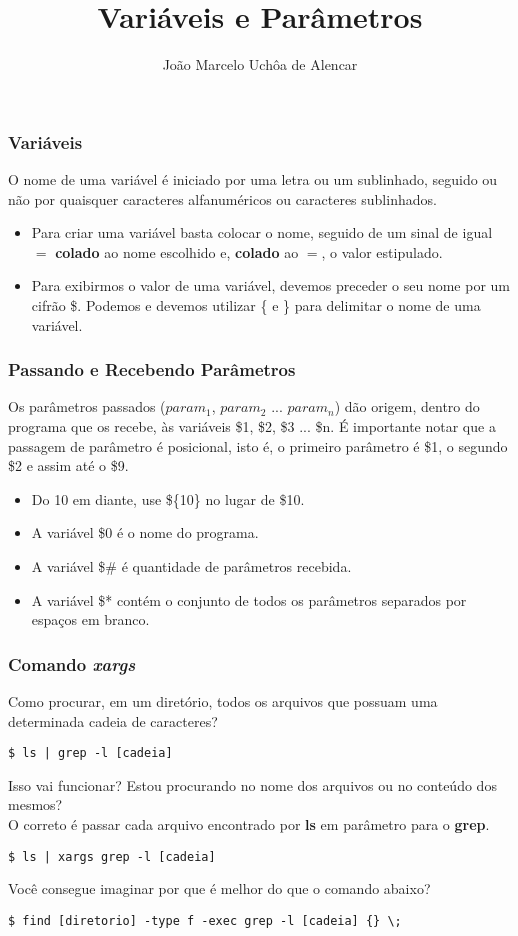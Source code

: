\documentclass{beamer}
\title{Variáveis e Parâmetros}
\author[João Marcelo Uchôa de Alencar]{João Marcelo Uchôa de Alencar}
\institute{Universidade Federal do Ceará - Quixadá}
\begin{document}
   \begin{frame}
      \titlepage
   \end{frame}

   \begin{frame}
      \frametitle{Variáveis}
      O nome de uma variável é iniciado por uma letra ou um sublinhado, seguido ou não por quaisquer caracteres alfanuméricos ou caracteres sublinhados.
      \begin{itemize}
         \item Para criar uma variável basta colocar o nome, seguido de um sinal de igual $=$ \textbf{colado} ao nome escolhido e, \textbf{colado} ao $=$, o valor estipulado.
	      \item Para exibirmos o valor de uma variável, devemos preceder o seu nome por um cifrão \$. Podemos e devemos utilizar \{ e \} para delimitar o nome de uma variável.
      \end{itemize}
   \end{frame}

   \begin{frame}
      \frametitle{Passando e Recebendo Parâmetros}
      Os parâmetros passados ($param_ {1}$, $param_ {2}$ ... $param_ {n}$) dão origem, dentro do programa que os recebe, às variáveis \$1, \$2, \$3 ... \$n. É importante notar que a passagem de parâmetro é posicional, isto é, o primeiro parâmetro é \$1, o segundo \$2 e assim até o \$9.
      \begin{itemize}
         \item Do 10 em diante, use \$\{10\} no lugar de \$10.
	      \item A variável \$0 é o nome do programa.
	      \item A variável \$\# é quantidade de parâmetros recebida.
	      \item A variável \$* contém o conjunto de todos os parâmetros separados por espaços em branco.
      \end{itemize}
   \end{frame}

\begin{frame}[fragile]
   \frametitle{Comando \textit{xargs}}
   Como procurar, em um diretório, todos os arquivos que possuam uma determinada cadeia de caracteres? 
   \begin{verbatim}	
$ ls | grep -l [cadeia] 
   \end{verbatim}
   Isso vai funcionar? Estou procurando no nome dos arquivos ou no conteúdo dos mesmos? \\
   O correto é passar cada arquivo encontrado por \textbf{ls} em parâmetro para o \textbf{grep}. 
   \begin{verbatim}
$ ls | xargs grep -l [cadeia] 
   \end{verbatim}
   Você consegue imaginar por que é melhor do que o comando abaixo? 
   \begin{verbatim}
$ find [diretorio] -type f -exec grep -l [cadeia] {} \;
   \end{verbatim}
\end{frame}
\end{document}
